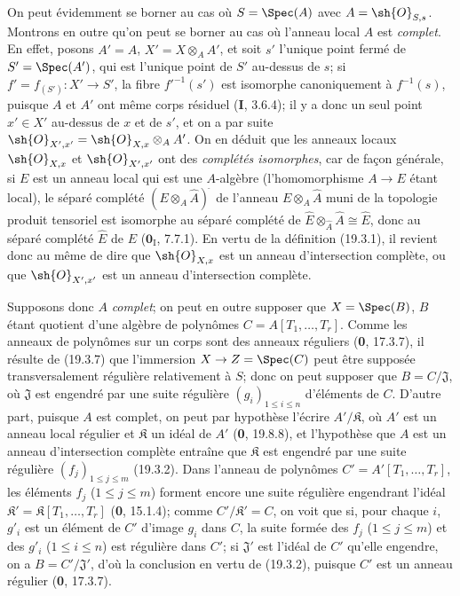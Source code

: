 On peut évidemment se borner au cas où $S=\Spec(A)$ avec $A=\sh{O}_{S,s}$. Montrons en outre qu'on peut se borner au cas où l'anneau local $A$ est \emph{complet}. En effet, posons $A'=\widehat A$, $X'=X\otimes_A A'$, et soit $s'$ l'unique point fermé de $S'=\Spec(A')$, qui est l'unique point de $S'$ au-dessus de $s$; si $f'=f_{(S')}:X'\to S'$, la fibre $f'^{-1}(s')$ est isomorphe canoniquement à $f^{-1}(s)$, puisque $A$ et $A'$ ont même corps résiduel (\textbf{I}, 3.6.4); il y a donc un seul point $x'\in X'$ au-dessus de $x$ et de $s'$, et on a par suite $\sh{O}_{X',x'}=\sh{O}_{X,x}\otimes_A A'$. On en déduit que les anneaux locaux $\sh{O}_{X,x}$ et $\sh{O}_{X',x'}$ ont des \emph{complétés isomorphes}, car de façon générale, si $E$ est un anneau local qui est une $A$-algèbre (l'homomorphisme $A\to E$ étant local), le séparé complété $(E\otimes_A\widehat A)^{\widehat{\,}}$ de l'anneau $E\otimes_A\widehat A$ muni de la topologie produit tensoriel est isomorphe au séparé complété de $\widehat E\otimes_{\widehat A}\widehat A\cong\widehat E$, donc au séparé complété $\widehat E$ de $E$ ($\mathbf{0}_{\mathrm I}$, 7.7.1). En vertu de la définition (19.3.1), il revient donc au même de dire que $\sh{O}_{X,x}$ est un anneau d'intersection complète, ou que $\sh{O}_{X',x'}$ est un anneau d'intersection complète.

Supposons donc $A$ \emph{complet}; on peut en outre supposer que $X=\Spec(B)$, $B$ étant quotient d'une algèbre de polynômes $C=A[T_1,\ldots,T_r]$. Comme les anneaux de polynômes sur un corps sont des anneaux réguliers (\textbf{0}, 17.3.7), il résulte de (19.3.7) que l'immersion $X\to Z=\Spec(C)$ peut être supposée transversalement régulière relativement à $S$; donc on peut supposer que $B=C/\mathfrak J$, où $\mathfrak J$ est engendré par une suite régulière $(g_i)_{1\leq i\leq n}$ d'éléments de $C$. D'autre part, puisque $A$ est complet, on peut par hypothèse l'écrire $A'/\mathfrak K$, où $A'$ est un anneau local régulier et $\mathfrak K$ un idéal de $A'$ (\textbf{0}, 19.8.8), et l'hypothèse que $A$ est un anneau d'intersection complète entraîne que $\mathfrak K$ est engendré par une suite régulière $(f_j)_{1\leq j\leq m}$ (19.3.2). Dans l'anneau de polynômes $C'=A'[T_1,\ldots,T_r]$, les éléments $f_j$ ($1\leq j\leq m$) forment encore une suite régulière engendrant l'idéal $\mathfrak K'=\mathfrak K[T_1,\ldots,T_r]$ (\textbf{0}, 15.1.4); comme $C'/\mathfrak K'=C$, on voit que si, pour chaque $i$, $g'_i$ est un élément de $C'$ d'image $g_i$ dans $C$, la suite formée des $f_j$ ($1\leq j\leq m$) et des $g'_i$ ($1\leq i\leq n$) est régulière dans $C'$; si $\mathfrak J'$ est l'idéal de $C'$ qu'elle engendre, on a $B=C'/\mathfrak J'$, d'où la conclusion en vertu de (19.3.2), puisque $C'$ est un anneau régulier (\textbf{0}, 17.3.7).

